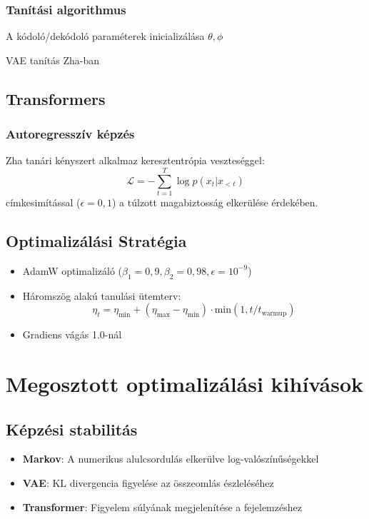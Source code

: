 \subsubsection{Tanítási algorithmus}
\begin{algoritm}
\SetAlgoLined
A kódoló/dekódoló paraméterek inicializálása $\theta, \phi$\;
\caption{VAE tanítás Zha-ban}
\end{algoritm}

\subsection{Transformers}
\subsubsection{Autoregresszív képzés}
Zha tanári kényszert alkalmaz keresztentrópia veszteséggel:
\[
\mathcal{L} = -\sum_{t=1}^T \log p(x_t | x_{<t})
\]
címkesimítással ($\epsilon=0,1$) a túlzott magabiztosság elkerülése érdekében.

\subsection{Optimalizálási Stratégia}
\begin{itemize}
    \item AdamW optimalizáló ($\beta_1=0,9, \beta_2=0,98, \epsilon=10^{-9}$)
    \item Háromszög alakú tanulási ütemterv:
    \[
    \eta_t = \eta_{\text{min}} + (\eta_{\text{max}} - \eta_{\text{min}}) \cdot \text{min}(1, t/t_{\text{warmup}})
    \]
    \item Gradiens vágás 1.0-nál
\end{itemize}

\section{Megosztott optimalizálási kihívások}

\subsection{Képzési stabilitás}
\begin{itemize}
    \item \textbf{Markov}: A numerikus alulcsordulás elkerülve log-valószínűségekkel
    \item \textbf{VAE}: KL divergencia figyelése az összeomlás észleléséhez
    \item \textbf{Transformer}: Figyelem súlyának megjelenítése a fejelemzéshez
\end{itemize}

